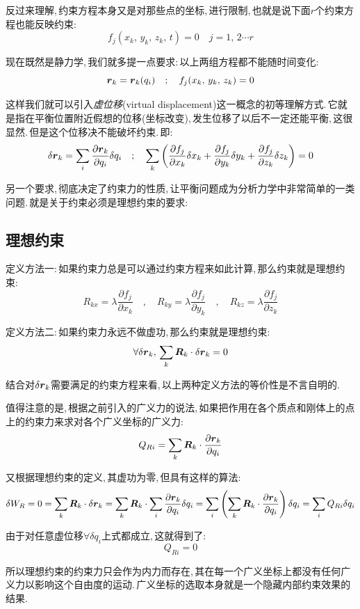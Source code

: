 反过来理解,\,约束方程本身又是对那些点的坐标,\,进行限制,\,也就是说下面$r$个约束方程也能反映约束:
\[f_j(x_k,\,y_k,\,z_k,\,t)=0\quad j=1,\,2\cdots r\]

现在既然是静力学,\,我们就多提一点要求:\,以上两组方程都不能随时间变化:
\[\boldsymbol{r}_k=\boldsymbol{r}_k(q_i)\quad;\quad f_j(x_k,\,y_k,\,z_k)=0\]

这样我们就可以引入\emph{虚位移}(virtual displacement)这一概念的初等理解方式.\,它就是指在平衡位置附近假想的位移(坐标改变),\,发生位移了以后不一定还能平衡,\,这很显然.\,但是这个位移决不能破坏约束.\,即:
\[\delta \boldsymbol{r}_k=\sum_i \frac{\partial \boldsymbol{r}_k}{\partial q_i}\delta q_i \quad;\quad \sum_k\left(\frac{\partial f_j}{\partial x_k}\delta x_k+\frac{\partial f_j}{\partial y_k}\delta y_k+\frac{\partial f_j}{\partial z_k}\delta z_k\right)=0\]

另一个要求,\,彻底决定了约束力的性质,\,让平衡问题成为分析力学中非常简单的一类问题.\,就是关于约束必须是理想约束的要求:

\subsection{理想约束}

定义方法一:\,如果约束力总是可以通过约束方程来如此计算,\,那么约束就是理想约束:
\[R_{kx}=\lambda \frac{\partial f_j}{\partial x_k}\quad,\quad R_{ky}=\lambda \frac{\partial f_j}{\partial y_k}\quad,\quad R_{kz}=\lambda \frac{\partial f_j}{\partial z_k}\]

定义方法二:\,如果约束力永远不做虚功,\,那么约束就是理想约束:
\[\forall \delta \boldsymbol{r}_k,\,\sum_k \boldsymbol{R}_k\cdot \delta \boldsymbol{r}_k=0\]

结合对$\delta \boldsymbol{r}_k$需要满足的约束方程来看,\,以上两种定义方法的等价性是不言自明的.

值得注意的是,\,根据之前引入的广义力的说法,\,如果把作用在各个质点和刚体上的点上的约束力来求对各个广义坐标的广义力:
\[Q_{Ri}=\sum_k \boldsymbol{R}_k\cdot \frac{\partial \boldsymbol{r}_k}{\partial q_i}\]

又根据理想约束的定义,\,其虚功为零,\,但具有这样的算法:
\[\delta W_R=0=\sum_k \boldsymbol{R}_k\cdot \delta \boldsymbol{r}_k=\sum_k \boldsymbol{R}_k\cdot \sum_i \frac{\partial \boldsymbol{r}_k}{\partial q_i}\delta q_i=\sum_i\left(\sum_k \boldsymbol{R}_k\cdot \frac{\partial \boldsymbol{r}_k}{\partial q_i}\right)\delta q_i=\sum_i Q_{Ri}\delta q_i\]

由于对任意虚位移$\forall\delta q_i$上式都成立,\,这就得到了:
\[Q_{Ri}=0\]

所以理想约束的约束力只会作为内力而存在,\,其在每一个广义坐标上都没有任何广义力以影响这个自由度的运动.\,广义坐标的选取本身就是一个隐藏内部约束效果的结果.



